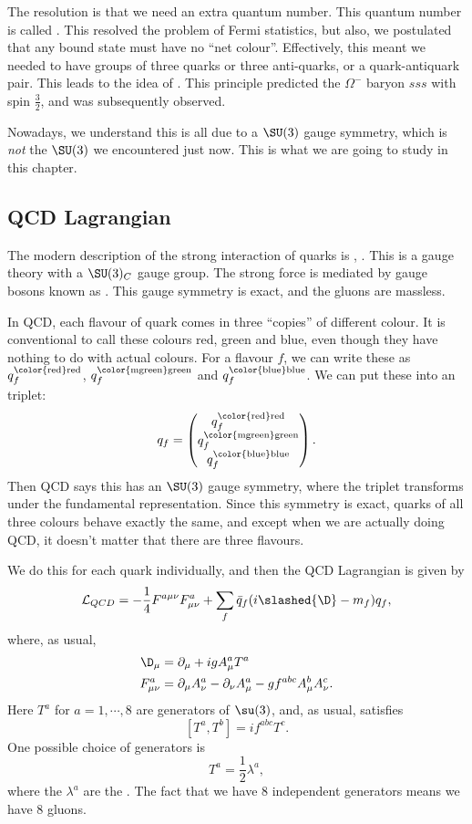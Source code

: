 \documentclass[a4paper]{article}
\begin{document}
The resolution is that we need an extra quantum number. This quantum number is called . This resolved the problem of Fermi statistics, but also, we postulated that any bound state must have no ``net colour''. Effectively, this meant we needed to have groups of three quarks or three anti-quarks, or a quark-antiquark pair. This leads to the idea of . This principle predicted the $\Omega^-$ baryon $sss$ with spin $\frac{3}{2}$, and was subsequently observed.

Nowadays, we understand this is all due to a $\SU(3)$ gauge symmetry, which is \emph{not} the $\SU(3)$ we encountered just now. This is what we are going to study in this chapter.

\subsection{QCD Lagrangian}
The modern description of the strong interaction of quarks is , . This is a gauge theory with a $\SU(3)_C$ gauge group. The strong force is mediated by gauge bosons known as . This gauge symmetry is exact, and the gluons are massless.

In QCD, each flavour of quark comes in three ``copies'' of different colour. It is conventional to call these colours red, green and blue, even though they have nothing to do with actual colours. For a flavour $f$, we can write these as $q_f^{\mathrm{\color{red} red}}$, $q_f^{\mathrm{\color{mgreen} green}}$ and $q_f^{\mathrm{\color{blue} blue}}$. We can put these into an triplet:
\[
  q_f =
  \begin{pmatrix}
    q_f^{\mathrm{\color{red} red}}\\
    q_f^{\mathrm{\color{mgreen} green}}\\
    q_f^{\mathrm{\color{blue} blue}}
  \end{pmatrix}.
\]
Then QCD says this has an $\SU(3)$ gauge symmetry, where the triplet transforms under the fundamental representation. Since this symmetry is exact, quarks of all three colours behave exactly the same, and except when we are actually doing QCD, it doesn't matter that there are three flavours.

We do this for each quark individually, and then the QCD Lagrangian is given by
\[
  \mathcal{L}_{QCD} = -\frac{1}{4} F^{a\mu\nu} F^a_{\mu\nu} + \sum_f \bar{q}_f (i \slashed{\D} - m_f) q_f,
\]
where, as usual,
\begin{align*}
  \D_\mu &= \partial_\mu + i g A_\mu^a T^a\\
  F_{\mu\nu}^a &= \partial_\mu A_\nu^a - \partial_\nu A_\mu^a - g f^{abc} A_\mu^b A_\nu^c.
\end{align*}
Here $T^a$ for $a = 1, \cdots, 8$ are generators of $\su(3)$, and, as usual, satisfies
\[
  [T^a, T^b] = i f^{abc}T^c.
\]
One possible choice of generators is
\[
  T^a = \frac{1}{2} \lambda^a,
\]
where the $\lambda^a$ are the . The fact that we have 8 independent generators means we have 8 gluons.
\end{document}
